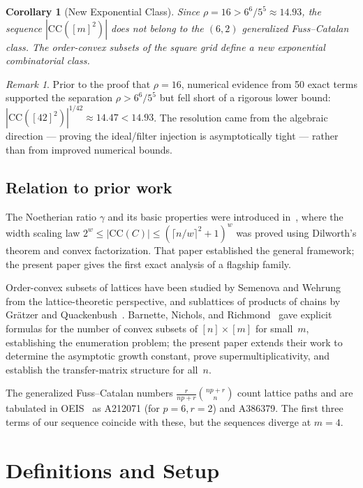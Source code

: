\documentclass[11pt,a4paper]{article}
\theoremstyle{plain}
\newtheorem{corollary}[theorem]{Corollary}
\theoremstyle{definition}
\theoremstyle{remark}
\newtheorem{remark}[theorem]{Remark}
\newcommand{\CC}{\mathrm{CC}}
\begin{document}
\begin{corollary}[New Exponential Class]\label{cor:newclass}
Since $\rho = 16 > 6^6/5^5 \approx 14.93$, the sequence $|\CC([m]^2)|$ does not belong to the $(6,2)$ generalized Fuss--Catalan class.
The order-convex subsets of the square grid define a new exponential combinatorial class.
\end{corollary}

\begin{remark}
Prior to the proof that $\rho = 16$, numerical evidence from 50 exact terms supported the separation $\rho > 6^6/5^5$ but fell short of a rigorous lower bound: $|\CC([42]^2)|^{1/42} \approx 14.47 < 14.93$.
The resolution came from the algebraic direction --- proving the ideal/filter injection is asymptotically tight --- rather than from improved numerical bounds.
\end{remark}

\subsection{Relation to prior work}

The Noetherian ratio $\gamma$ and its basic properties were introduced in~\cite{difiore2026cag}, where the width scaling law $2^w \leq |\CC(C)| \leq (\lceil n/w \rceil^2 + 1)^w$ was proved using Dilworth's theorem and convex factorization.
That paper established the general framework; the present paper gives the first exact analysis of a flagship family.

Order-convex subsets of lattices have been studied by Semenova and Wehrung~\cite{semenova2002} from the lattice-theoretic perspective, and sublattices of products of chains by Gr\"atzer and Quackenbush~\cite{gratzer2010}.
Barnette, Nichols, and Richmond~\cite{barnette2019} gave explicit formulas for the number of convex subsets of $[n] \times [m]$ for small~$m$, establishing the enumeration problem; the present paper extends their work to determine the asymptotic growth constant, prove supermultiplicativity, and establish the transfer-matrix structure for all~$n$.

The generalized Fuss--Catalan numbers $\frac{r}{np+r}\binom{np+r}{n}$ count lattice paths and are tabulated in OEIS~\cite{oeis} as A212071 (for $p=6, r=2$) and A386379.
The first three terms of our sequence coincide with these, but the sequences diverge at $m = 4$.


\section{Definitions and Setup}\label{sec:setup}
\end{document}
